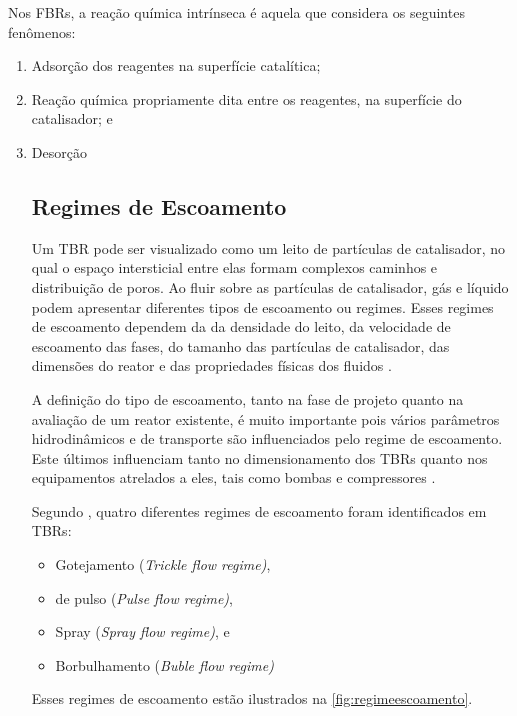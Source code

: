 Nos FBRs, a reação química intrínseca é aquela que considera os seguintes fenômenos: 
\begin{enumerate}
\item Adsorção dos reagentes na superfície catalítica; 
\item Reação química propriamente dita entre os reagentes, na superfície do catalisador; e
\item Desorção  

\subsection {Regimes de Escoamento}
\label{sec:escoamento}

Um TBR pode ser visualizado como um leito de partículas de catalisador, no qual
o espaço intersticial entre elas formam complexos caminhos e distribuição de
poros. Ao fluir sobre as partículas de catalisador, gás e líquido podem
apresentar diferentes tipos de escoamento ou regimes. Esses regimes de
escoamento dependem da da densidade do leito, da velocidade de escoamento das
fases, do tamanho das partículas de catalisador, das dimensões do reator e das
propriedades físicas dos fluidos \cite{Ranade2011}.

A definição do tipo de escoamento, tanto na fase de projeto quanto na avaliação
de um reator existente, é muito importante pois vários parâmetros
hidrodinâmicos e de transporte são influenciados pelo regime de escoamento. Este
últimos influenciam tanto no dimensionamento dos TBRs quanto nos
equipamentos atrelados a eles, tais como bombas e compressores
\cite{Ranade2011}.

Segundo , quatro
diferentes regimes de escoamento foram identificados em TBRs:

\begin{itemize}
\item Gotejamento (\emph{Trickle flow regime)},
\item de pulso (\emph{Pulse flow regime)},
\item Spray (\emph{Spray flow regime)}, e
\item Borbulhamento (\emph{Buble flow regime)}
\end{itemize}

Esses regimes de escoamento estão ilustrados na \autoref{fig:regimeescoamento}.


\end{enumerate}
